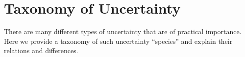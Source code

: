 

%

 \section{Taxonomy of Uncertainty}
There are many different types of uncertainty that are of practical importance. Here we provide a taxonomy of such uncertainty ``species'' and explain their relations and differences. 

